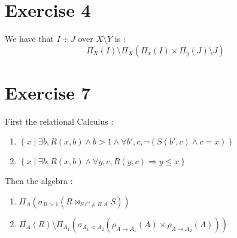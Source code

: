 \documentclass{cours}
\begin{document}
\section{Exercise 4}
We have that $I \div J$ over $X \setminus Y$ is : 
\[
    \Pi_{X}(I) \setminus \Pi_{X}\left(\Pi_{x}(I)\times \Pi_{y}(J) \setminus J\right)
\]


\section{Exercise 7}
First the relational Calculus :
\begin{enumerate}
    \item $\left\{x \mid \exists b, R(x, b) \land b > 1 \land \forall b', c, \lnot \left(S(b', c) \land c = x\right)\right\}$
    \item $\left\{x \mid \exists b, R(x, b) \land \forall y, c, R(y, c) \Rightarrow y \leq x\right\}$
\end{enumerate}
Then the algebra : 
\begin{enumerate}
    \item $\Pi_{A}(\sigma_{B > 1}(R \bowtie_{S.C \neq R.A} S))$
    \item $\Pi_{A}(R) \setminus \Pi_{A_{1}}(\sigma_{A_{1} < A_{2}}\left(\rho_{A \to A_{1}}(A) \times \rho_{A \to A_{2}}(A)\right))$
\end{enumerate}
\end{document}
